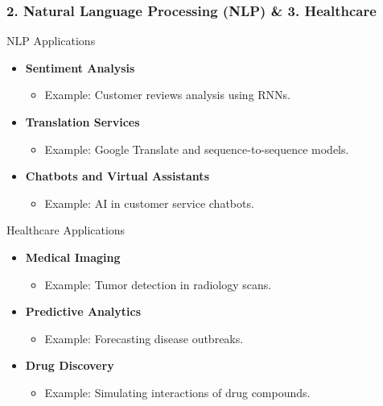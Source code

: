 \documentclass{beamer}
\begin{document}
\begin{frame}[fragile]
    \frametitle{2. Natural Language Processing (NLP) \& 3. Healthcare}
    \begin{block}{NLP Applications}
        \begin{itemize}
            \item \textbf{Sentiment Analysis}
                \begin{itemize}
                    \item Example: Customer reviews analysis using RNNs.
                \end{itemize}
            \item \textbf{Translation Services}
                \begin{itemize}
                    \item Example: Google Translate and sequence-to-sequence models.
                \end{itemize}
            \item \textbf{Chatbots and Virtual Assistants}
                \begin{itemize}
                    \item Example: AI in customer service chatbots.
                \end{itemize}
        \end{itemize}
    \end{block}
    
    \begin{block}{Healthcare Applications}
        \begin{itemize}
            \item \textbf{Medical Imaging}
                \begin{itemize}
                    \item Example: Tumor detection in radiology scans.
                \end{itemize}
            \item \textbf{Predictive Analytics}
                \begin{itemize}
                    \item Example: Forecasting disease outbreaks.
                \end{itemize}
            \item \textbf{Drug Discovery}
                \begin{itemize}
                    \item Example: Simulating interactions of drug compounds.
                \end{itemize}
        \end{itemize}
    \end{block}
\end{frame}
\end{document}
